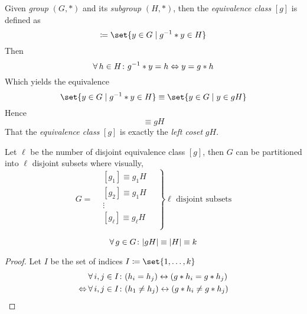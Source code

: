 \begin{definition}
    Given \textit{group} $(G, \ast)$ and its \textit{subgroup} $(H, \ast)$, then the \textit{equivalence class} $[g]$ is defined as
    \begin{equation}
        [g] \coloneqq \set{y \in G \mid \Inverse{g} \ast y \in H}
    \end{equation}
    Then
    \begin{equation}
        \operatorname{\forall} h \in H \colon {g}^{-1} \ast y = h \Leftrightarrow y = g \ast h
    \end{equation}
    Which yields the equivalence
    \begin{equation}
        \set{y \in G \mid \Inverse{g} \ast y \in H} \equiv \set{y \in G \mid y \in gH}
    \end{equation}
    Hence
    \begin{equation}
        [g] \equiv gH
    \end{equation}
    That the \textit{equivalence class} $[g]$ is exactly the \textit{left coset} $gH$.
    
    Let $\ell$ be the number of disjoint equivalence class $[g]$, then $G$ can be partitioned into $\ell$ disjoint subsets where visually,
    \begin{equation}
        G = \left. \begin{matrix}
            &\boxed{ [g_1] \equiv g_1 H } \\
            &\boxed{ [g_2] \equiv g_1 H } \\
            &\vdots \\
            &\boxed{ [g_\ell] \equiv g_\ell H } \\
        \end{matrix} \quad \right\} \ell \text{ disjoint subsets}
    \end{equation}
\end{definition}

\begin{proposition}
    \begin{equation}
        \operatorname{\forall} g \in G \colon \lvert gH \rvert \equiv \lvert H \rvert \equiv k
    \end{equation}
\end{proposition}

\begin{proof}
    Let $I$ be the set of indices $I \coloneqq \set{1, \dots, k}$
    \begin{align}
        &\operatorname{\forall} i, j \in I \colon (h_i = h_j) \leftrightarrow (g \ast h_i = g \ast h_j) \\
        \Leftrightarrow &\operatorname{\forall} i, j \in I \colon (h_1 \ne h_j) \leftrightarrow  (g \ast h_i \ne g \ast h_j)
    \end{align}
\end{proof}

